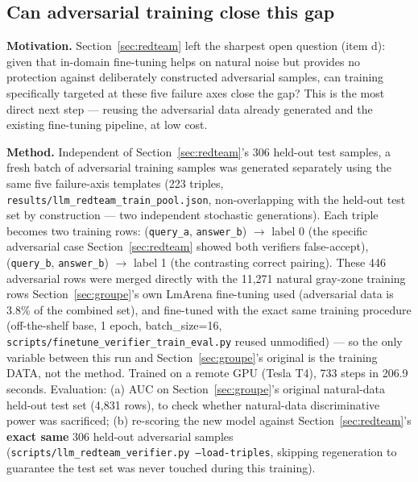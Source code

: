 \documentclass[11pt]{article}
\begin{document}
\subsection{Can adversarial training close this gap}
\label{sec:advtrain}

\textbf{Motivation.} Section~\ref{sec:redteam} left the sharpest open question (item d): given that in-domain fine-tuning helps on natural noise but provides no protection against deliberately constructed adversarial samples, can training specifically targeted at these five failure axes close the gap? This is the most direct next step --- reusing the adversarial data already generated and the existing fine-tuning pipeline, at low cost.

\textbf{Method.} Independent of Section~\ref{sec:redteam}'s 306 held-out test samples, a fresh batch of adversarial training samples was generated separately using the same five failure-axis templates (223 triples, \texttt{results/\allowbreak{}llm\_\allowbreak{}redteam\_\allowbreak{}train\_\allowbreak{}pool.\allowbreak{}json}, non-overlapping with the held-out test set by construction --- two independent stochastic generations). Each triple becomes two training rows: (\texttt{query\_\allowbreak{}a}, \texttt{answer\_\allowbreak{}b}) $\to$ label 0 (the specific adversarial case Section~\ref{sec:redteam} showed both verifiers false-accept), (\texttt{query\_\allowbreak{}b}, \texttt{answer\_\allowbreak{}b}) $\to$ label 1 (the contrasting correct pairing). These 446 adversarial rows were merged directly with the 11{,}271 natural gray-zone training rows Section~\ref{sec:groupe}'s own LmArena fine-tuning used (adversarial data is 3.8\% of the combined set), and fine-tuned with the exact same training procedure (off-the-shelf base, 1 epoch, batch\_size=16, \texttt{scripts/\allowbreak{}finetune\_\allowbreak{}verifier\_\allowbreak{}train\_\allowbreak{}eval.\allowbreak{}py} reused unmodified) --- so the only variable between this run and Section~\ref{sec:groupe}'s original is the training DATA, not the method. Trained on a remote GPU (Tesla T4), 733 steps in 206.9 seconds. Evaluation: (a) AUC on Section~\ref{sec:groupe}'s original natural-data held-out test set (4{,}831 rows), to check whether natural-data discriminative power was sacrificed; (b) re-scoring the new model against Section~\ref{sec:redteam}'s \textbf{exact same} 306 held-out adversarial samples (\texttt{scripts/\allowbreak{}llm\_\allowbreak{}redteam\_\allowbreak{}verifier.\allowbreak{}py --load-triples}, skipping regeneration to guarantee the test set was never touched during this training).
\end{document}
